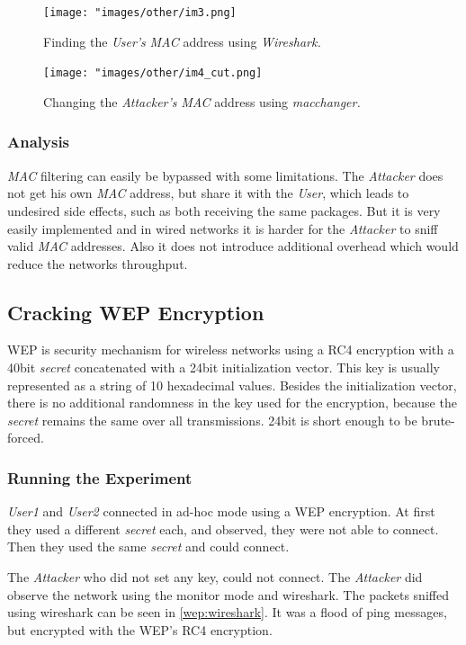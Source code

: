 \documentclass[12pt,a4paper]{article}
\begin{document}
	\begin{figure}
		\texttt{[image: "images/other/im3.png]}
		\caption{Finding the \emph{User's} \emph{MAC} address using \emph{Wireshark.}}
		\label{mac:wireshark}
	\end{figure}
	
	\begin{figure}
		\texttt{[image: "images/other/im4\_cut.png]}
		\caption{Changing the \emph{Attacker's} \emph{MAC} address using \emph{macchanger.}}
		\label{mac:changer}
	\end{figure}
	\subsubsection{Analysis}
		\emph{MAC} filtering can easily be bypassed with some limitations. The \emph{Attacker} does not get his own \emph{MAC} address, but share it with the \emph{User}, which leads to undesired side effects, such as both receiving the same packages. But it is very easily implemented and in wired networks it is harder for the \emph{Attacker} to sniff valid \emph{MAC} addresses. Also it does not introduce additional overhead which would reduce the networks throughput.
		
  \subsection{Cracking WEP Encryption}
	WEP is security mechanism for wireless networks using a RC4 encryption with a 40bit \emph{secret} concatenated with a 24bit initialization vector. This key is usually represented as a string of 10 hexadecimal values. Besides the initialization vector, there is no additional randomness in the key used for the encryption, because the \emph{secret} remains the same over all transmissions. 24bit is short enough to be brute-forced.\cite{wep}
	
	\subsubsection{Running the Experiment}
		\emph{User1} and \emph{User2} connected in ad-hoc mode using a WEP encryption.
		At first they used a different \emph{secret} each, and observed, they were not able to connect. Then they used the same \emph{secret} and could connect.
		
		The \emph{Attacker} who did not set any key, could not connect.
		The \emph{Attacker} did observe the network using the monitor mode and wireshark.
		The packets sniffed using wireshark can be seen in \autoref{wep:wireshark}. It was a flood of ping messages, but encrypted with the WEP's RC4 encryption.
		
\end{document}
